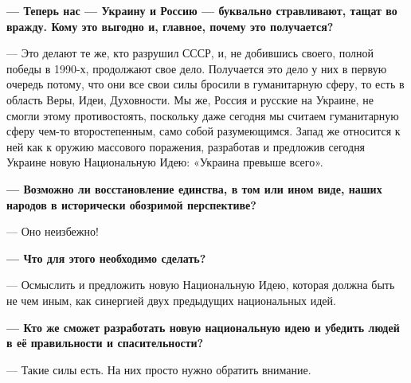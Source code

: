 \textbf{— Теперь нас — Украину и Россию — буквально стравливают, тащат во вражду. Кому
это выгодно и, главное, почему это получается?}

— Это делают те же, кто разрушил СССР, и, не добившись своего, полной победы в
1990-х, продолжают свое дело. Получается это дело у них в первую очередь
потому, что они все свои силы бросили в гуманитарную сферу, то есть в область
Веры, Идеи, Духовности. Мы же, Россия и русские на Украине, не смогли этому
противостоять, поскольку даже сегодня мы считаем гуманитарную сферу чем-то
второстепенным, само собой разумеющимся. Запад же относится к ней как к оружию
массового поражения, разработав и предложив сегодня Украине новую Национальную
Идею: «Украина превыше всего».

\textbf{— Возможно ли восстановление единства, в том или ином виде, наших народов в исторически обозримой перспективе?}

— Оно неизбежно!

\textbf{— Что для этого необходимо сделать?}

— Осмыслить и предложить новую Национальную Идею, которая должна быть не чем иным, как синергией двух предыдущих национальных идей.

{\bfseries 
— Кто же сможет разработать новую национальную идею и убедить людей в её правильности и спасительности?
}

— Такие силы есть. На них просто нужно обратить внимание.

